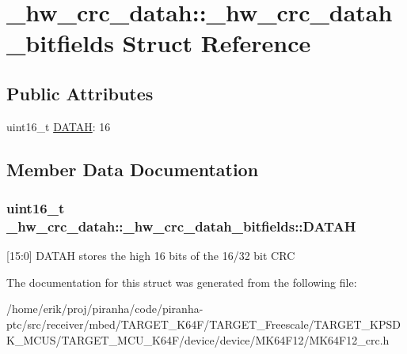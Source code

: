 \hypertarget{struct__hw__crc__datah_1_1__hw__crc__datah__bitfields}{}\section{\+\_\+hw\+\_\+crc\+\_\+datah\+:\+:\+\_\+hw\+\_\+crc\+\_\+datah\+\_\+bitfields Struct Reference}
\label{struct__hw__crc__datah_1_1__hw__crc__datah__bitfields}
\subsection*{Public Attributes}
\begin{DoxyCompactItemize}
\item 
uint16\+\_\+t \hyperlink{struct__hw__crc__datah_1_1__hw__crc__datah__bitfields_af804bc8d18ed2b698a508576e89815f2}{D\+A\+T\+AH}\+: 16
\end{DoxyCompactItemize}


\subsection{Member Data Documentation}
\subsubsection[{\texorpdfstring{D\+A\+T\+AH}{DATAH}}]{\setlength{\rightskip}{0pt plus 5cm}uint16\+\_\+t \+\_\+hw\+\_\+crc\+\_\+datah\+::\+\_\+hw\+\_\+crc\+\_\+datah\+\_\+bitfields\+::\+D\+A\+T\+AH}\hypertarget{struct__hw__crc__datah_1_1__hw__crc__datah__bitfields_af804bc8d18ed2b698a508576e89815f2}{}\label{struct__hw__crc__datah_1_1__hw__crc__datah__bitfields_af804bc8d18ed2b698a508576e89815f2}
\mbox{[}15\+:0\mbox{]} D\+A\+T\+AH stores the high 16 bits of the 16/32 bit C\+RC 

The documentation for this struct was generated from the following file\+:\begin{DoxyCompactItemize}
\item 
/home/erik/proj/piranha/code/piranha-\/ptc/src/receiver/mbed/\+T\+A\+R\+G\+E\+T\+\_\+\+K64\+F/\+T\+A\+R\+G\+E\+T\+\_\+\+Freescale/\+T\+A\+R\+G\+E\+T\+\_\+\+K\+P\+S\+D\+K\+\_\+\+M\+C\+U\+S/\+T\+A\+R\+G\+E\+T\+\_\+\+M\+C\+U\+\_\+\+K64\+F/device/device/\+M\+K64\+F12/M\+K64\+F12\+\_\+crc.\+h\end{DoxyCompactItemize}
